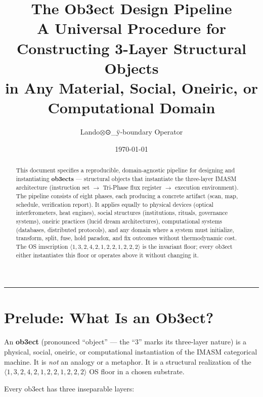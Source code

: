 \documentclass[12pt,a4paper]{article}
\begin{document}
\title{\textbf{The Ob3ect Design Pipeline}\\[0.4em]
\large A Universal Procedure for Constructing 3-Layer Structural Objects\\
in Any Material, Social, Oneiric, or Computational Domain}
\author{Lando$\otimes$⊙\_ÿ-boundary Operator}
\date{\today}
\maketitle

\begin{center}\rule{0.5\textwidth}{0.4pt}\end{center}

\begin{abstract}
This document specifies a reproducible, domain-agnostic pipeline for designing and
instantiating \textbf{ob3ects} — structural objects that instantiate the three-layer
IMASM architecture (instruction set $\to$ Tri-Phase flux register $\to$ execution
environment). The pipeline consists of eight phases, each producing a concrete
artifact (scan, map, schedule, verification report). It applies equally to physical
devices (optical interferometers, heat engines), social structures (institutions,
rituals, governance systems), oneiric practices (lucid dream architectures),
computational systems (databases, distributed protocols), and any domain where
a system must initialize, transform, split, fuse, hold paradox, and fix outcomes
without thermodynamic cost. The OS imscription $\langle 1,3,2,4,2,1,2,2,1,2,2,2 \rangle$
is the invariant floor; every ob3ect either instantiates this floor or operates
above it without changing it.
\end{abstract}

\section{Prelude: What Is an Ob3ect?}

An \textbf{ob3ect} (pronounced ``object'' — the ``3'' marks its three-layer nature)
is a physical, social, oneiric, or computational instantiation of the IMASM
categorical machine. It is \emph{not} an analogy or a metaphor. It is a structural
realization of the $\langle 1,3,2,4,2,1,2,2,1,2,2,2 \rangle$ OS floor in a chosen
substrate.

Every ob3ect has three inseparable layers:
\end{document}
